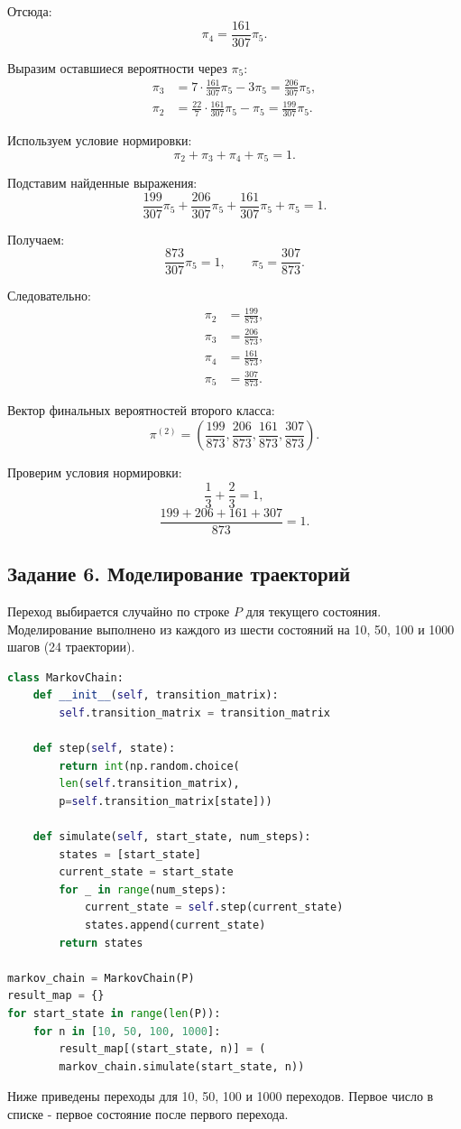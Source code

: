 \documentclass[a4paper, final]{article}
\begin{document}
	
	Отсюда:
	\[
	{
		\pi_4=\frac{161}{307}\pi_5
	}.
	\]
	
	Выразим оставшиеся вероятности через $\pi_5$:
	\[
	\begin{aligned}
		\pi_3
		&=7\cdot\frac{161}{307}\pi_5-3\pi_5
		=\frac{206}{307}\pi_5,\\
		\pi_2
		&=\frac{22}{7}\cdot\frac{161}{307}\pi_5-\pi_5
		=\frac{199}{307}\pi_5.
	\end{aligned}
	\]
	
	Используем условие нормировки:
	\[
	\pi_2+\pi_3+\pi_4+\pi_5=1.
	\]
	
	Подставим найденные выражения:
	\[
	\frac{199}{307}\pi_5+
	\frac{206}{307}\pi_5+
	\frac{161}{307}\pi_5+
	\pi_5=1.
	\]
	
	Получаем:
	\[
	\frac{873}{307}\pi_5=1,
	\qquad
	\pi_5=\frac{307}{873}.
	\]
	
	Следовательно:
	\[
	\begin{aligned}
		\pi_2&=\frac{199}{873},\\
		\pi_3&=\frac{206}{873},\\
		\pi_4&=\frac{161}{873},\\
		\pi_5&=\frac{307}{873}.
	\end{aligned}
	\]
	
	Вектор финальных вероятностей второго класса:
	\[
	{
		\pi^{(2)}=
		\left(
		\frac{199}{873},
		\frac{206}{873},
		\frac{161}{873},
		\frac{307}{873}
		\right)
	}.
	\]
	
	
	Проверим условия нормировки:
	\[
	\frac13+\frac23=1,
	\]
	\[
	\frac{199+206+161+307}{873}=1.
	\]
	
\subsection*{Задание 6. Моделирование траекторий}
Переход выбирается случайно по строке $P$ для текущего состояния.
Моделирование выполнено из каждого из шести состояний на
10, 50, 100 и 1000 шагов (24 траектории).
\lstset{
	frame= single}
\begin{lstlisting}[language=Python]
class MarkovChain:
	def __init__(self, transition_matrix):
		self.transition_matrix = transition_matrix
	
	def step(self, state):
		return int(np.random.choice(
		len(self.transition_matrix),
		p=self.transition_matrix[state]))
	
	def simulate(self, start_state, num_steps):
		states = [start_state]
		current_state = start_state
		for _ in range(num_steps):
			current_state = self.step(current_state)
			states.append(current_state)
		return states

markov_chain = MarkovChain(P)
result_map = {}
for start_state in range(len(P)):
	for n in [10, 50, 100, 1000]:
		result_map[(start_state, n)] = (
		markov_chain.simulate(start_state, n))
\end{lstlisting}
Ниже приведены переходы для 10, 50, 100 и 1000 переходов. Первое число в списке - первое состояние после первого перехода.
\end{document}
